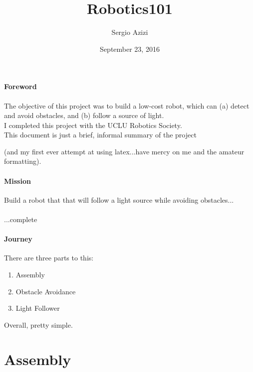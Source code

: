 \documentclass[final,3p,times]{article}
\begin{document}
\title{Robotics101}
\author{Sergio Azizi}
\date{September 23, 2016}
\maketitle

\paragraph{Foreword}
The objective of this project was to build a low-cost robot, which can (a) detect and avoid obstacles, and (b) 
follow a source of light. \\
I completed this project with the UCLU Robotics Society.\\
This document is just a brief, informal summary of the project \\
\begin{tiny}
(and my first ever attempt at using latex...have mercy on me and the amateur formatting).
\end{tiny}

\paragraph{Mission}
Build a robot that that will follow a light source while avoiding obstacles...\\
\\
...complete

\paragraph{Journey}
There are three parts to this:
\begin{enumerate}
\item Assembly
\item Obstacle Avoidance
\item Light Follower
\end{enumerate}
Overall, pretty simple.

\newpage

\section{Assembly}
\end{document}
